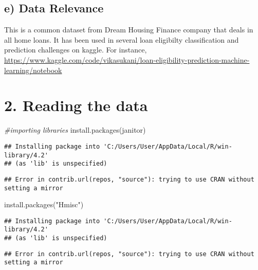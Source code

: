 \documentclass[
]{article}
\newenvironment{Shaded}{\begin{snugshade}}{\end{snugshade}}
\newcommand{\CommentTok}[1]{\textcolor[rgb]{0.56,0.35,0.01}{\textit{#1}}}
\newcommand{\FunctionTok}[1]{\textcolor[rgb]{0.00,0.00,0.00}{#1}}
\newcommand{\NormalTok}[1]{#1}
\newcommand{\StringTok}[1]{\textcolor[rgb]{0.31,0.60,0.02}{#1}}
\begin{document}
\hypertarget{e-data-relevance}{%
\subsection{e) Data Relevance}\label{e-data-relevance}}

This is a common dataset from Dream Housing Finance company that deals
in all home loans. It has been used in several loan eligibilty
classification and prediction challenges on kaggle. For instance,
\url{https://www.kaggle.com/code/vikasukani/loan-eligibility-prediction-machine-learning/notebook}

\hypertarget{reading-the-data}{%
\section{2. Reading the data}\label{reading-the-data}}

\begin{Shaded}
\begin{Highlighting}[]
\CommentTok{\#importing libraries}
\FunctionTok{install.packages}\NormalTok{(}\StringTok{\textquotesingle{}janitor\textquotesingle{}}\NormalTok{)}
\end{Highlighting}
\end{Shaded}

\begin{verbatim}
## Installing package into 'C:/Users/User/AppData/Local/R/win-library/4.2'
## (as 'lib' is unspecified)
\end{verbatim}

\begin{verbatim}
## Error in contrib.url(repos, "source"): trying to use CRAN without setting a mirror
\end{verbatim}

\begin{Shaded}
\begin{Highlighting}[]
\FunctionTok{install.packages}\NormalTok{(}\StringTok{"Hmisc"}\NormalTok{)}
\end{Highlighting}
\end{Shaded}

\begin{verbatim}
## Installing package into 'C:/Users/User/AppData/Local/R/win-library/4.2'
## (as 'lib' is unspecified)
\end{verbatim}

\begin{verbatim}
## Error in contrib.url(repos, "source"): trying to use CRAN without setting a mirror
\end{verbatim}
\end{document}
